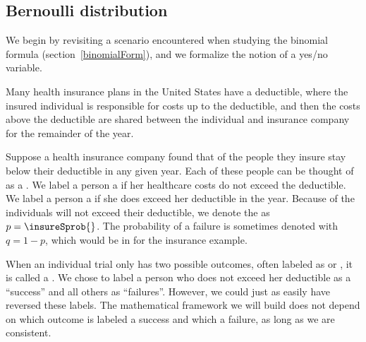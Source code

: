 \subsection{Bernoulli distribution}
\label{bernoulli}



We begin by revisiting a scenario encountered when studying the binomial formula (section~\ref{binomialForm}), and we formalize the notion of a yes/no variable.

Many health insurance plans in the United States have
a deductible, where the insured individual is responsible
for costs up to the deductible, and then the costs above
the deductible are shared between the individual and
insurance company for the remainder of the year.

Suppose a health insurance company found that \insureSperc{} of the
people they insure stay below their deductible in any given year.
Each of these people can be thought of as a .
We label a person a  if her healthcare costs
do not exceed the deductible.
We label a person a  if she does exceed her
deductible in the year.
Because \insureSperc{} of the individuals will not exceed their deductible,
we denote the  as
$p = \insureSprob{}$.
The probability of a failure is sometimes denoted with
$q = 1 - p$, which would be \insureFprob{} in for the insurance
example.

When an individual trial only has two possible outcomes, often
labeled as  or , it is called a
.
We chose to label a person who does not exceed her deductible
as a ``success'' and all others as ``failures''.
However, we could just as easily have reversed these labels.
The mathematical framework we will build does not depend
on which outcome is labeled a success and which a failure,
as long as we are consistent.

